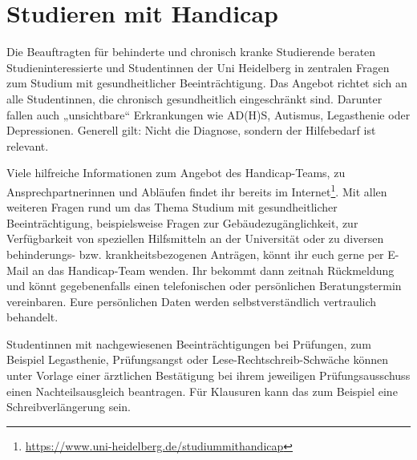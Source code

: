 \section{Studieren mit Handicap}
Die Beauftragten für behinderte und chronisch kranke Studierende beraten Studieninteressierte und Studentinnen der Uni Heidelberg in zentralen Fragen zum Studium mit gesundheitlicher Beeinträchtigung.
Das Angebot richtet sich an alle Studentinnen, die chronisch gesundheitlich eingeschränkt sind. Darunter fallen auch „unsichtbare“ Erkrankungen wie AD(H)S, Autismus, Legasthenie oder Depressionen. Generell gilt: Nicht die Diagnose, sondern der Hilfebedarf ist relevant.

Viele hilfreiche Informationen zum Angebot des Handicap-Teams, zu Ansprechpartnerinnen und Abläufen findet ihr bereits im Internet\footnote{\url{https://www.uni-heidelberg.de/studiummithandicap}}. Mit allen weiteren Fragen rund um das Thema Studium mit gesundheitlicher Beeinträchtigung, beispielsweise Fragen zur Gebäudezugänglichkeit,  zur Verfügbarkeit von speziellen Hilfsmitteln an der Universität oder zu diversen behinderungs- bzw. krankheitsbezogenen Anträgen, könnt ihr euch gerne per E-Mail an das Handicap-Team wenden. Ihr bekommt dann zeitnah Rückmeldung und könnt gegebenenfalls einen telefonischen oder persönlichen Beratungstermin vereinbaren.
Eure persönlichen Daten werden selbstverständlich vertraulich behandelt.

Studentinnen mit nachgewiesenen Beeinträchtigungen bei Prüfungen, zum Beispiel Legasthenie, Prüfungsangst oder Lese-Rechtschreib-Schwäche können unter Vorlage einer ärztlichen Bestätigung bei ihrem jeweiligen Prüfungsausschuss einen Nachteilsausgleich beantragen. Für Klausuren kann das zum Beispiel eine Schreibverlängerung sein.
